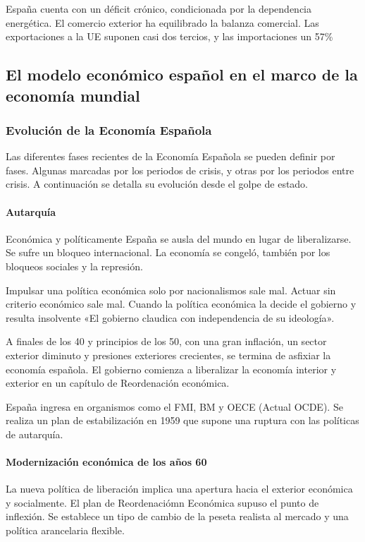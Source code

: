         España cuenta con un déficit crónico, condicionada por la dependencia energética. El comercio exterior ha equilibrado la balanza comercial. Las exportaciones a la UE suponen casi dos tercios, y las importaciones un 57\%

\subsection{El modelo económico español en el marco de la economía mundial} %
    \subsubsection{Evolución de la Economía Española}
        Las diferentes fases recientes de la Economía Española se pueden definir por fases. Algunas marcadas por los periodos de crisis, y otras por los periodos entre crisis. A continuación se detalla su evolución desde el golpe de estado.

        \paragraph{Autarquía} %
            Económica y políticamente España se ausla del mundo en lugar de liberalizarse. Se sufre un bloqueo internacional. La economía se congeló, también por los bloqueos sociales y la represión.

            Impulsar una política económica solo por nacionalismos sale mal. Actuar sin criterio económico sale mal. Cuando la política económica la decide el gobierno y resulta insolvente «El gobierno claudica con independencia de su ideología».

            A finales de los 40 y principios de los 50, con una gran inflación, un sector exterior diminuto y presiones exteriores crecientes, se termina de asfixiar la economía española. El gobierno comienza a liberalizar la economía interior y exterior en un capítulo de Reordenación económica.

            España ingresa en organismos como el FMI, BM y OECE (Actual OCDE). Se realiza un plan de estabilización en 1959 que supone una ruptura con las políticas de autarquía.

        \paragraph{Modernización económica de los años 60} %
            La nueva política de liberación implica una apertura hacia el exterior económica y socialmente. El plan de Reordenaciómn Económica supuso el punto de inflexión. Se establece un tipo de cambio de la peseta realista al mercado y una política arancelaria flexible.

